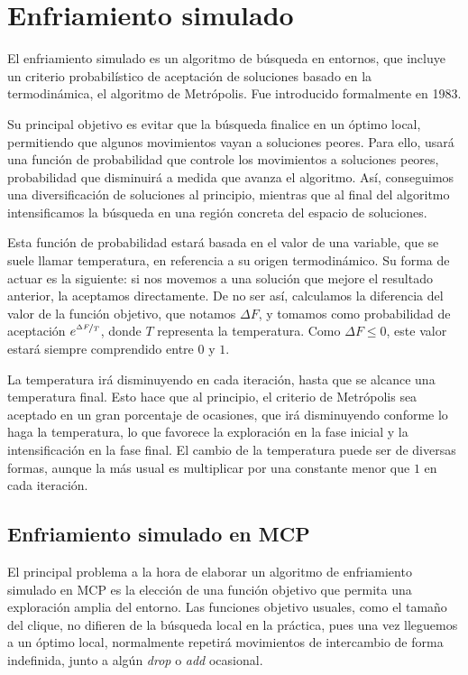 \section{Enfriamiento simulado}

El enfriamiento simulado es un algoritmo de búsqueda en entornos, que incluye un criterio probabilístico
de aceptación de soluciones basado en la termodinámica, el algoritmo de Metrópolis. Fue introducido formalmente en 1983.

Su principal objetivo es evitar que la búsqueda finalice en un óptimo local, permitiendo que algunos
movimientos vayan a soluciones peores. Para ello, usará una función de probabilidad que controle
los movimientos a soluciones peores, probabilidad que disminuirá a medida que avanza el algoritmo.
Así, conseguimos una diversificación de soluciones al principio, mientras que al final del algoritmo
intensificamos la búsqueda en una región concreta del espacio de soluciones.

Esta función de probabilidad estará basada en el valor de una variable, que se suele llamar temperatura,
en referencia a su origen termodinámico. Su forma de actuar es la siguiente: si nos movemos a una solución
que mejore el resultado anterior, la aceptamos directamente. De no ser así, calculamos la diferencia
del valor de la función objetivo, que notamos $\Delta F$, y tomamos como probabilidad de aceptación
$e^{\nicefrac{\Delta F}{T}}$, donde $T$ representa la temperatura. Como $\Delta F \leq 0$, este valor estará
siempre comprendido entre $0$ y $1$.

La temperatura irá disminuyendo en cada iteración, hasta que se alcance una temperatura final. Esto hace
que al principio, el criterio de Metrópolis sea aceptado en un gran porcentaje de ocasiones, que irá disminuyendo
conforme lo haga la temperatura, lo que favorece la exploración en la fase inicial y la intensificación
en la fase final. El cambio de la temperatura puede ser de diversas formas, aunque la más usual es multiplicar
por una constante menor que $1$ en cada iteración.

\subsection{Enfriamiento simulado en MCP}

El principal problema a la hora de elaborar un algoritmo de enfriamiento simulado en MCP es la elección
de una función objetivo que permita una exploración amplia del entorno. Las funciones objetivo usuales,
como el tamaño del clique, no difieren de la búsqueda local en la práctica, pues una vez lleguemos a un
óptimo local, normalmente repetirá movimientos de intercambio de forma indefinida, junto a algún
\textit{drop} o \textit{add} ocasional.

